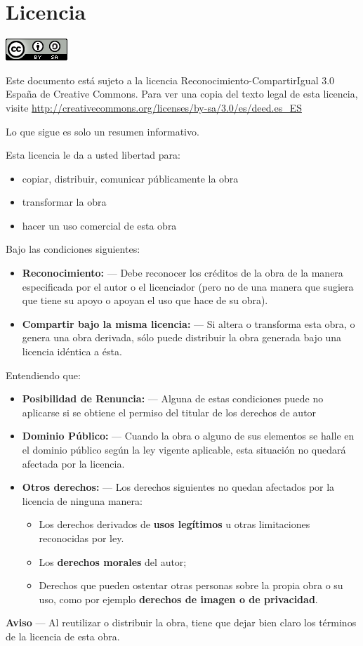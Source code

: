 \chapter*{Licencia}

\includegraphics{ccbysa-88x31.png}

Este documento está sujeto a la licencia 
Reconocimiento-CompartirIgual 3.0 España de Creative Commons.
Para ver una copia del texto legal de esta licencia, visite
\href{http://creativecommons.org/licenses/by-sa/3.0/es/deed.es\_ES}{http://creativecommons.org/licenses/by-sa/3.0/es/deed.es\_ES}

Lo que sigue es solo un resumen informativo.
{
\itemsep1pt\parskip0pt

Esta licencia le da a usted libertad para:
\begin{itemize}
\itemsep1pt\parskip0pt
\item copiar, distribuir, comunicar públicamente la obra
\item transformar la obra
\item hacer un uso comercial de esta obra
\end{itemize}

Bajo las condiciones siguientes:
\begin{itemize}
\itemsep1pt\parskip0pt
\item
{\bf Reconocimiento:} —
Debe reconocer los créditos de la obra de la manera especificada por el autor o el licenciador (pero no de una manera que sugiera que tiene su apoyo o apoyan el uso que hace de su obra).
\item
{\bf Compartir bajo la misma licencia:} —
Si altera o transforma esta obra, o genera una obra derivada, sólo puede distribuir la obra generada bajo una licencia idéntica a ésta.
\end{itemize}

Entendiendo que:
\begin{itemize}
\itemsep1pt\parskip0pt
\item
{\bf Posibilidad de Renuncia:} —
Alguna de estas condiciones puede no aplicarse si se obtiene el permiso del titular de los derechos de autor
\item
{\bf Dominio Público:} —
Cuando la obra o alguno de sus elementos se halle en el dominio público según la ley vigente aplicable, esta situación no quedará afectada por la licencia.
\item
{\bf Otros derechos:} — 
Los derechos siguientes no quedan afectados por la licencia de ninguna manera:
\begin{itemize}
\item 
Los derechos derivados de {\bf usos legítimos} u otras limitaciones reconocidas por ley.
\item
Los {\bf derechos morales} del autor;
\item
Derechos que pueden ostentar otras personas sobre la propia obra o su uso, como por ejemplo {\bf derechos de imagen o de privacidad}.
\end{itemize}
\end{itemize}

{\bf Aviso} — Al reutilizar o distribuir la obra, tiene que dejar bien claro los términos de la licencia de esta obra.
}

